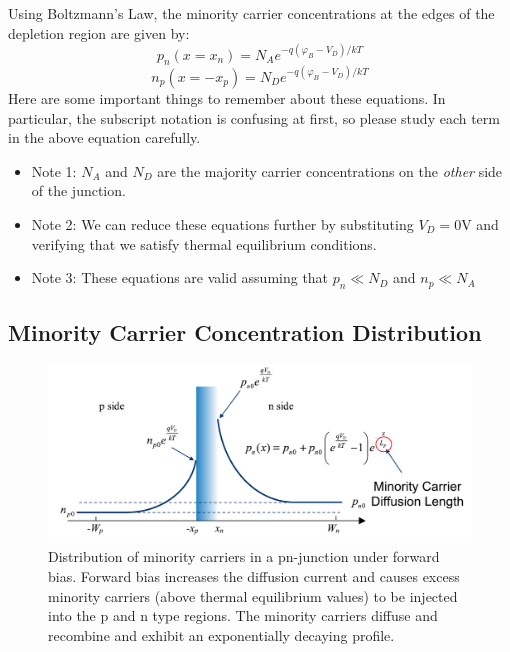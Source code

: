 Using Boltzmann's Law, the minority carrier concentrations at the edges of the depletion region are given by:
\begin{equation} 
	{p_n}(x = {x_n}) = {N_A}{e^{ - q({\varphi _B} - {V_D})/kT}}
\end{equation}
\begin{equation} 
	{n_p}(x =  - {x_p}) = {N_D}{e^{ - q({\varphi _B} - {V_D})/kT}}
\end{equation}
Here are some important things to remember about these equations.  In particular, the subscript notation is confusing at first, so please study each term in the above equation carefully.
\begin{itemize}
	\item Note 1: $N_A$ and $N_D$ are the majority carrier concentrations on the \textit{other} side of the junction.
	\item  Note 2: We can reduce these equations further by substituting $V_D = 0$V and verifying that we satisfy thermal equilibrium conditions.
	\item  Note 3:  These equations are valid assuming that $p_n \ll N_D$ and $n_p \ll N_A$
\end{itemize}
\subsection{Minority Carrier Concentration Distribution}
\begin{figure}[tb]
\begin{center}
\includegraphics[width=.75\columnwidth]{slide41}
\end{center}
\caption{Distribution of minority carriers in a pn-junction under forward bias.  Forward bias increases the diffusion current and causes excess minority carriers (above thermal equilibrium values) to be injected into the p and n type regions.  The minority carriers diffuse and recombine and exhibit an exponentially decaying profile. }
\label{fig:slide41}
\end{figure}

